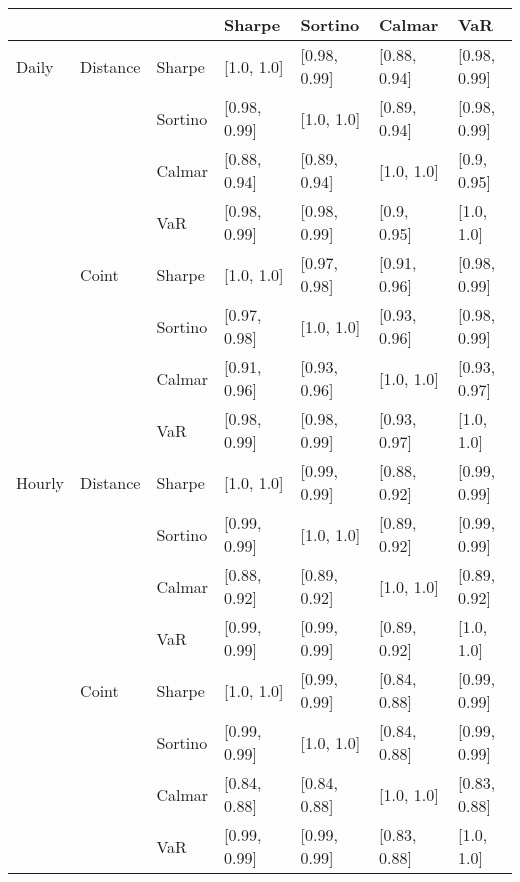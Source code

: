 \begin{tabular}{lllllll}
\toprule
       &       &     &        Sharpe &       Sortino &        Calmar &           VaR \\
\midrule
Daily & Distance & Sharpe &    [1.0, 1.0] &  [0.98, 0.99] &  [0.88, 0.94] &  [0.98, 0.99] \\
       &       & Sortino &  [0.98, 0.99] &    [1.0, 1.0] &  [0.89, 0.94] &  [0.98, 0.99] \\
       &       & Calmar &  [0.88, 0.94] &  [0.89, 0.94] &    [1.0, 1.0] &   [0.9, 0.95] \\
       &       & VaR &  [0.98, 0.99] &  [0.98, 0.99] &   [0.9, 0.95] &    [1.0, 1.0] \\
       & Coint & Sharpe &    [1.0, 1.0] &  [0.97, 0.98] &  [0.91, 0.96] &  [0.98, 0.99] \\
       &       & Sortino &  [0.97, 0.98] &    [1.0, 1.0] &  [0.93, 0.96] &  [0.98, 0.99] \\
       &       & Calmar &  [0.91, 0.96] &  [0.93, 0.96] &    [1.0, 1.0] &  [0.93, 0.97] \\
       &       & VaR &  [0.98, 0.99] &  [0.98, 0.99] &  [0.93, 0.97] &    [1.0, 1.0] \\
Hourly & Distance & Sharpe &    [1.0, 1.0] &  [0.99, 0.99] &  [0.88, 0.92] &  [0.99, 0.99] \\
       &       & Sortino &  [0.99, 0.99] &    [1.0, 1.0] &  [0.89, 0.92] &  [0.99, 0.99] \\
       &       & Calmar &  [0.88, 0.92] &  [0.89, 0.92] &    [1.0, 1.0] &  [0.89, 0.92] \\
       &       & VaR &  [0.99, 0.99] &  [0.99, 0.99] &  [0.89, 0.92] &    [1.0, 1.0] \\
       & Coint & Sharpe &    [1.0, 1.0] &  [0.99, 0.99] &  [0.84, 0.88] &  [0.99, 0.99] \\
       &       & Sortino &  [0.99, 0.99] &    [1.0, 1.0] &  [0.84, 0.88] &  [0.99, 0.99] \\
       &       & Calmar &  [0.84, 0.88] &  [0.84, 0.88] &    [1.0, 1.0] &  [0.83, 0.88] \\
       &       & VaR &  [0.99, 0.99] &  [0.99, 0.99] &  [0.83, 0.88] &    [1.0, 1.0] \\
\bottomrule
\end{tabular}
